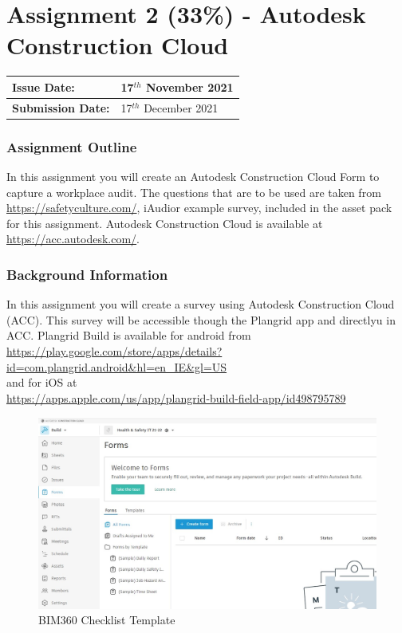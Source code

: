 
	
\part*{Assignment 2 (33\%) - Autodesk Construction Cloud}

\begin{tabularx}{\textwidth}{ |X|X| }
	\hline
	\textbf{Issue Date:} & 17$^{th}$ November 2021 \\
	\hline 
	\textbf{Submission Date:}  & 17$^{th}$ December 2021  \\
	\hline
\end{tabularx}


\section*{Assignment Outline}


In this assignment you will create an Autodesk Construction Cloud Form to capture a workplace audit.  The questions that are to be used are taken from \href{https://safetyculture.com/}{https://safetyculture.com/}, iAudior example survey, included in the asset pack for this assignment.  Autodesk Construction Cloud is available at \href{https://acc.autodesk.com/}{https://acc.autodesk.com/}.


\section*{Background Information}

In this assignment you will create a survey using Autodesk Construction Cloud (ACC).  This survey will be accessible though the Plangrid app and directlyu in ACC.  Plangrid Build is available for android from\\ \href{https://play.google.com/store/apps/details?id=com.plangrid.android&hl=en_IE&gl=US}{https://play.google.com/store/apps/details?id=com.plangrid.android\&hl=en\_IE\&gl=US} \\and for iOS at\\ \href{https://apps.apple.com/us/app/plangrid-build-field-app/id498795789}{https://apps.apple.com/us/app/plangrid-build-field-app/id498795789}\\ 


\begin{figure}
	\centering
	\includegraphics[width=1.0\linewidth]{./img/ACC-Forms.jpg}
	\caption{BIM360 Checklist Template}
	\label{fig:BIM369ChecklistTemplate}
\end{figure}


